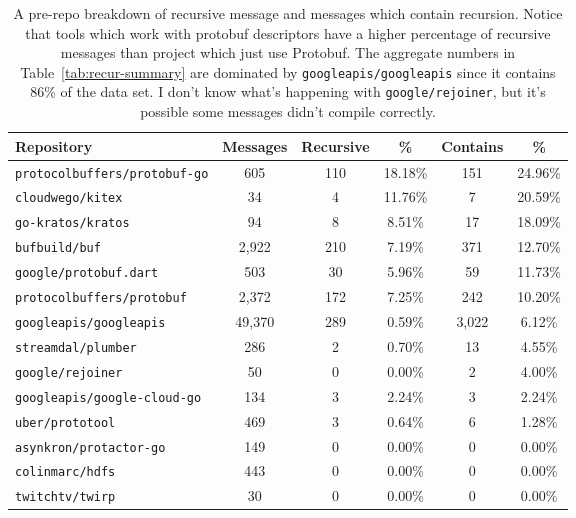 \begin{table}[H]
\centering
\begin{tabular}{lccccc}
    \toprule
    Repository & Messages & Recursive & \% & Contains & \% \\
    \midrule
    \texttt{protocolbuffers/protobuf-go} & 605 & 110 & 18.18\% & 151 & 24.96\% \\
    \texttt{cloudwego/kitex} & 34 & 4 & 11.76\% & 7 & 20.59\% \\
    \texttt{go-kratos/kratos} & 94 & 8 & 8.51\% & 17 & 18.09\% \\
    \texttt{bufbuild/buf} & 2,922 & 210 & 7.19\% & 371 & 12.70\% \\
    \texttt{google/protobuf.dart} & 503 & 30 & 5.96\% & 59 & 11.73\% \\
    \texttt{protocolbuffers/protobuf} & 2,372 & 172 & 7.25\% & 242 & 10.20\% \\
    \texttt{googleapis/googleapis} & 49,370 & 289 & 0.59\% & 3,022 & 6.12\% \\
    \texttt{streamdal/plumber} & 286 & 2 & 0.70\% & 13 & 4.55\% \\
    \texttt{google/rejoiner} & 50 & 0 & 0.00\% & 2 & 4.00\% \\
    \texttt{googleapis/google-cloud-go} & 134 & 3 & 2.24\% & 3 & 2.24\% \\
    \texttt{uber/prototool} & 469 & 3 & 0.64\% & 6 & 1.28\% \\
    \texttt{asynkron/protactor-go} & 149 & 0 & 0.00\% & 0 & 0.00\% \\
    \texttt{colinmarc/hdfs} & 443 & 0 & 0.00\% & 0 & 0.00\% \\
    \texttt{twitchtv/twirp} & 30 & 0 & 0.00\% & 0 & 0.00\% \\
    \bottomrule
\end{tabular}
\caption[Per-repo recursive message breakdown]{A pre-repo breakdown of
    recursive message and messages which contain recursion. Notice that tools
    which work with protobuf descriptors have a higher percentage of recursive
    messages than project which just use Protobuf. The aggregate numbers in
    Table~\ref{tab:recur-summary} are dominated by
    \texttt{googleapis/googleapis} since it contains 86\% of the data set. I
    don't know what's happening with \texttt{google/rejoiner}, but it's
    possible some messages didn't compile correctly.}\label{tab:recur-repos}
\end{table}

